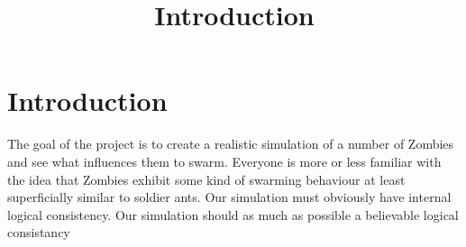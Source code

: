 \pagestyle{empty}

%

\title{Introduction}

\section{Introduction}
The goal of the project is to create a realistic simulation of a number of Zombies and see what influences them to swarm.
Everyone is more or less familiar with the idea that Zombies exhibit some kind of swarming behaviour at least superficially similar to soldier ants.
Our simulation must obviously have internal logical consistency.
Our simulation should as much as possible a believable logical consistancy
%
\endinput
